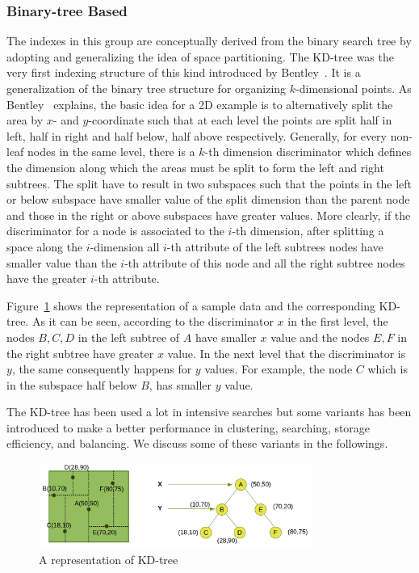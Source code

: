 \documentclass[a4paper,12pt]{article}
\begin{document}
\subsubsection{Binary-tree Based}
\label{binary-tree-based}
The indexes in this group are conceptually derived from the binary search tree by adopting and generalizing the idea of space partitioning. 
The KD-tree was the very first indexing structure of this kind introduced by Bentley~\cite{bently1975}. 
It is a generalization of the binary tree structure for organizing $k$-dimensional points. As Bentley~\cite{bently1975} explains, the basic idea for a 2D example is to alternatively split the area by $x$- and $y$-coordinate such that at each level the points are split half in left, half in right and half below, half above respectively. Generally, for every non-leaf nodes in the same level, there is a $k$-th dimension discriminator which defines the dimension along which the areas must be split to form the left and right subtrees. The split have to result in two subspaces such that the points in the left or below subspace have smaller value of the split dimension than the parent node and those in the right or above subspaces have greater values. More clearly, if the discriminator for a node is associated to the $i$-th dimension, after splitting a space along the $i$-dimension all $i$-th attribute of the left subtrees nodes have smaller value than the $i$-th attribute of this node and all the right subtree nodes have the greater $i$-th attribute. 

Figure~\ref{figkdtree} shows the representation of a sample data and the corresponding KD-tree. As it can be seen, according to the discriminator $x$ in the first level, the nodes $B, C, D$ in the left subtree of $A$ have smaller $x$ value and the nodes $E, F$ in the right subtree have greater $x$ value. In the next level that the discriminator is $y$, the same consequently happens for $y$ values. For example, the node $C$ which is in the subspace half below $B$, has smaller $y$ value.

The KD-tree has been used a lot in intensive searches but some variants has been introduced to make a better performance in clustering, searching, storage efficiency,  
and balancing. We discuss some of these variants in the followings.

\begin{figure}
\centering
\includegraphics[width=0.8\textwidth]{kd-Tree}
\caption{A representation of KD-tree}
\label{figkdtree}
\end{figure}
\end{document}
